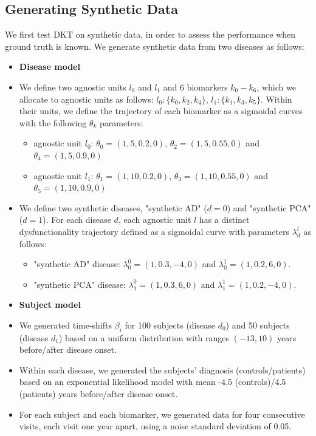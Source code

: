 \documentclass{llncs}
\begin{document}
\subsection{Generating Synthetic Data}
\label{sec:dktMetSyn}

We first test DKT on synthetic data, in order to assess the performance when ground truth is known. We generate synthetic data from two diseases as follows:
\begin{itemize}
 \item[] \textbf{Disease model}
 \item We define two agnostic units $l_0$ and $l_1$ and 6 biomarkers $k_0-k_6$, which we allocate to agnostic units as follows: $l_0:\{k_0, k_2, k_4\}$, $l_1: \{k_1, k_3, k_5\}$. Within their units, we define the trajectory of each biomarker as a sigmoidal curves with the following $\theta_k$ parameters:
 \begin{itemize}
  \item agnostic unit $l_0$: $\theta_0 = (1,5,0.2,0)$, $\theta_2 = (1,5,0.55,0)$ and $\theta_4 = (1,5,0.9,0)$ 
  \item agnostic unit $l_1$: $\theta_1 = (1,10,0.2,0)$, $\theta_3 = (1,10,0.55,0)$ and $\theta_5 = (1,10,0.9,0)$ 
 \end{itemize}
 \item We define two synthetic diseases, "synthetic AD" ($d=0$) and "synthetic PCA" ($d=1$). For each disease $d$, each agnostic unit $l$ has a distinct dysfunctionality trajectory defined as a sigmoidal curve with parameters $\lambda_d^l$ as follows: 
 \begin{itemize}
  \item "synthetic AD" disease: $\lambda_0^0 = (1, 0.3, -4, 0)$  and $\lambda_0^1 = (1, 0.2, 6, 0)$.
  \item "synthetic PCA" disease: $\lambda_1^0 = (1, 0.3, 6, 0)$ and $\lambda_1^1 = (1, 0.2, -4, 0)$.
 \end{itemize}

 \item[] \textbf{Subject model}
 \item We generated time-shifts $\beta_i$ for 100 subjects (disease $d_0$) and 50 subjects (disease $d_1$) based on a uniform distribution with ranges $(-13, 10)$ years before/after disease onset. 
 \item Within each disease, we generated the subjects' diagnosis (controls/patients) based on an exponential likelihood model with mean -4.5 (controls)/4.5 (patients) years before/after disease onset. 
 \item For each subject and each biomarker, we generated data for four consecutive visits, each visit one year apart, using a noise standard deviation of 0.05.
\end{itemize}
\end{document}
